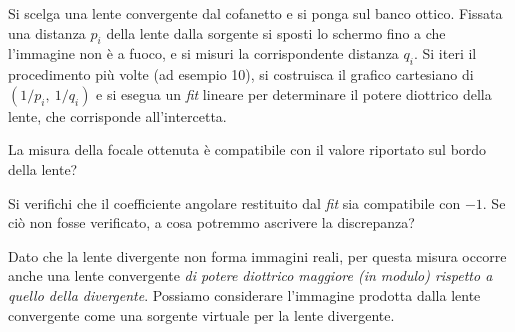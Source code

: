 \documentclass{lab1-article}
\begin{document}
\begin{article}
Si scelga una lente convergente dal cofanetto e si ponga sul banco ottico.
Fissata una distanza $p_i$ della lente dalla sorgente si sposti lo schermo
fino a che l'immagine non \`e a fuoco, e si misuri la corrispondente
distanza $q_i$. Si iteri il procedimento pi\`u volte (ad esempio 10), si
costruisca il grafico cartesiano di $(1/p_i,~1/q_i)$ e si esegua un \emph{fit}
lineare per determinare il potere diottrico della lente, che corrisponde
all'intercetta.

La misura della focale ottenuta \`e compatibile con il valore riportato sul
bordo della lente?

Si verifichi che il coefficiente angolare restituito dal \emph{fit}
sia compatibile con $-1$. Se ci\`o non fosse verificato, a cosa potremmo
ascrivere la discrepanza?



Dato che la lente divergente non forma immagini reali, per questa misura
occorre anche una lente convergente \emph{di potere diottrico maggiore (in
modulo) rispetto a quello della divergente}. Possiamo considerare l'immagine
prodotta dalla lente convergente come una sorgente virtuale per la lente
divergente.

\begin{figure}[htb!]
\begin{center}
\end{center}
\end{figure}
\end{article}
\end{document}
